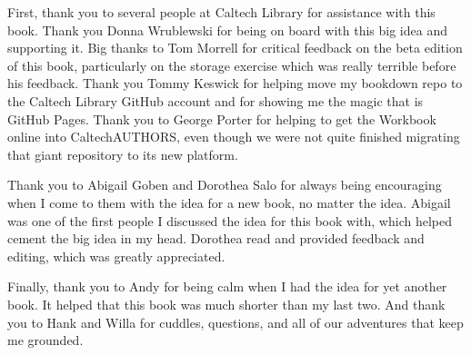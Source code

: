 \documentclass[
]{book}
\begin{document}
First, thank you to several people at Caltech Library for assistance with this book. Thank you Donna Wrublewski for being on board with this big idea and supporting it. Big thanks to Tom Morrell for critical feedback on the beta edition of this book, particularly on the storage exercise which was really terrible before his feedback. Thank you Tommy Keswick for helping move my bookdown repo to the Caltech Library GitHub account and for showing me the magic that is GitHub Pages. Thank you to George Porter for helping to get the Workbook online into CaltechAUTHORS, even though we were not quite finished migrating that giant repository to its new platform.

Thank you to Abigail Goben and Dorothea Salo for always being encouraging when I come to them with the idea for a new book, no matter the idea. Abigail was one of the first people I discussed the idea for this book with, which helped cement the big idea in my head. Dorothea read and provided feedback and editing, which was greatly appreciated.

Finally, thank you to Andy for being calm when I had the idea for yet another book. It helped that this book was much shorter than my last two. And thank you to Hank and Willa for cuddles, questions, and all of our adventures that keep me grounded.

  
\end{document}
